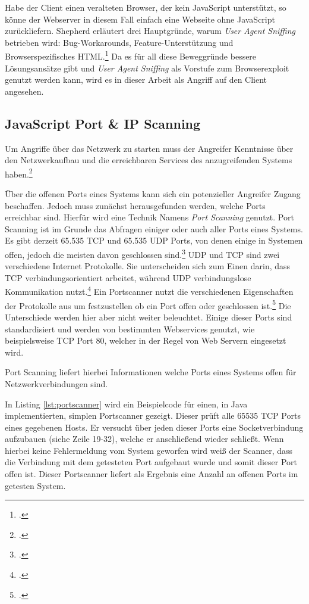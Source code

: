 Habe der Client einen veralteten Browser, der kein JavaScript unterstützt, so könne der
Webserver in diesem Fall einfach eine Webseite ohne JavaScript zurückliefern.
Shepherd erläutert drei Hauptgründe, warum \textit{User Agent Sniffing}
betrieben wird: Bug-Workarounds, Feature-Unterstützung und Browserspezifisches
HTML.\footcite[Vgl.][]{mdnBrowserDetection} Da es für all diese Beweggründe bessere Lösungsansätze
gibt und \textit{User Agent Sniffing} als Vorstufe zum Browserexploit genutzt werden kann, wird es
in dieser Arbeit als Angriff auf den Client angesehen.


\subsection{JavaScript Port \& IP Scanning}
Um Angriffe über das Netzwerk zu starten muss der Angreifer Kenntnisse über den Netzwerkaufbau und
die erreichbaren Services des anzugreifenden Systems haben.\footcite[Vgl.][937]{port1}

Über die offenen Ports eines Systems kann sich ein potenzieller Angreifer Zugang beschaffen. Jedoch
muss zunächst herausgefunden werden, welche Ports erreichbar sind. Hierfür wird eine Technik Namens
\textit{Port Scanning} genutzt. Port Scanning ist im Grunde das Abfragen einiger oder auch aller
Ports eines Systems. Es gibt derzeit 65.535 TCP und 65.535 UDP Ports, von denen einige in
Systemen offen, jedoch die meisten davon geschlossen sind.\footcite[Vgl.][937]{port1} UDP und TCP
sind zwei verschiedene Internet Protokolle. Sie unterscheiden sich zum Einen darin, dass TCP
verbindungsorientiert arbeitet, während UDP verbindungslose Kommunikation
nutzt.\footcite[Vgl.][]{tcpudp} Ein Portscanner nutzt die verschiedenen Eigenschaften der
Protokolle aus um festzustellen ob ein Port offen oder geschlossen ist.\footcite[Vgl.][31]{port2}
Die Unterschiede werden hier aber nicht weiter beleuchtet. Einige dieser Ports sind standardisiert
und werden von bestimmten Webservices genutzt, wie beispielsweise TCP Port 80, welcher in der Regel
von Web Servern eingesetzt wird.

Port Scanning liefert hierbei Informationen welche Ports eines Systems offen für Netzwerkverbindungen sind.

In Listing \ref{lst:portscanner} wird ein Beispielcode für einen, in Java implementierten, simplen Portscanner gezeigt. Dieser prüft alle 65535 TCP Ports eines gegebenen Hosts. Er versucht über jeden dieser Ports eine Socketverbindung aufzubauen (siehe Zeile 19-32), welche er anschließend wieder schließt. Wenn hierbei keine Fehlermeldung vom System geworfen wird weiß der Scanner, dass die Verbindung mit dem getesteten Port aufgebaut wurde und somit dieser Port offen ist. Dieser Portscanner liefert als Ergebnis eine Anzahl an offenen Ports im getesten System.


